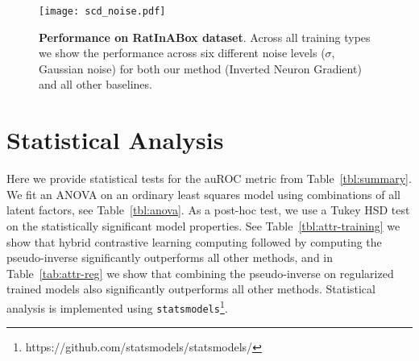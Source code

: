 \begin{figure*}[t]
    \centering
    \texttt{[image: scd\_noise.pdf]}
    \caption{\textbf{Performance on RatInABox dataset}. Across all training types we show the performance across six different noise levels ($\sigma$, Gaussian noise) for both our method (Inverted Neuron Gradient) and all other baselines. }
    \label{fig:noise}
\end{figure*}


\clearpage
\section{Statistical Analysis}\label{app:statistical_analysis}

Here we provide statistical tests for the auROC metric from Table~\ref{tbl:summary}. We fit an ANOVA on an ordinary least squares model using combinations of all latent factors, see Table~\ref{tbl:anova}.
As a post-hoc test, we use a Tukey HSD test on the statistically significant model properties.
See Table~\ref{tbl:attr-training} we show that hybrid contrastive learning computing followed by computing the pseudo-inverse significantly outperforms all other methods, and in Table~\ref{tab:attr-reg} we show that combining the pseudo-inverse on regularized trained models also significantly outperforms all other methods.
Statistical analysis is implemented using \texttt{statsmodels}\footnote{https://github.com/statsmodels/statsmodels/}.


